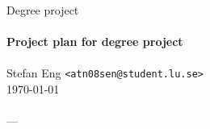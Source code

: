 \documentclass{article}
\begin{document}
\begin{center}

%
%
%
%

  Degree project \\
  \ \\
  {\large
    \textbf{Project plan for degree project}
  } \\
  \ \\
  Stefan Eng \texttt{<atn08sen@student.lu.se>}
  \ \\
  \today \\
  \ \\
  ---
  \vspace{-0.3cm}

\end{center}
\end{document}

